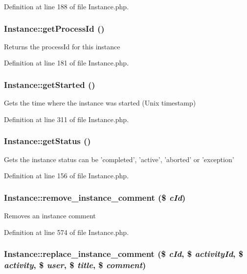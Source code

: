 Definition at line 188 of file Instance.php.
\subsubsection{\setlength{\rightskip}{0pt plus 5cm}Instance::get\-Process\-Id ()}\label{classInstance_a10}


Returns the process\-Id for this instance 

Definition at line 181 of file Instance.php.
\subsubsection{\setlength{\rightskip}{0pt plus 5cm}Instance::get\-Started ()}\label{classInstance_a20}


Gets the time where the instance was started (Unix timestamp) 

Definition at line 311 of file Instance.php.
\subsubsection{\setlength{\rightskip}{0pt plus 5cm}Instance::get\-Status ()}\label{classInstance_a7}


Gets the instance status can be 'completed', 'active', 'aborted' or 'exception' 

Definition at line 156 of file Instance.php.
\subsubsection{\setlength{\rightskip}{0pt plus 5cm}Instance::remove\_\-instance\_\-comment (\$ {\em c\-Id})}\label{classInstance_a28}


Removes an instance comment 

Definition at line 574 of file Instance.php.
\subsubsection{\setlength{\rightskip}{0pt plus 5cm}Instance::replace\_\-instance\_\-comment (\$ {\em c\-Id}, \$ {\em activity\-Id}, \$ {\em activity}, \$ {\em user}, \$ {\em title}, \$ {\em comment})}\label{classInstance_a27}


